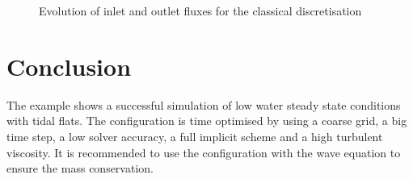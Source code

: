 \begin{figure} [h!]
\centering
{}
\caption{Evolution of inlet and outlet fluxes for the classical discretisation}
\label{t2d:wesel:fluxes}
\end{figure}

\section{Conclusion}
The example shows a successful simulation of low water steady state conditions
with tidal flats.
The configuration is time optimised by using a coarse grid, a big time step,
a low solver accuracy, a full implicit scheme and a high turbulent viscosity.
It is recommended to use the configuration with the wave equation to ensure the mass conservation. 






